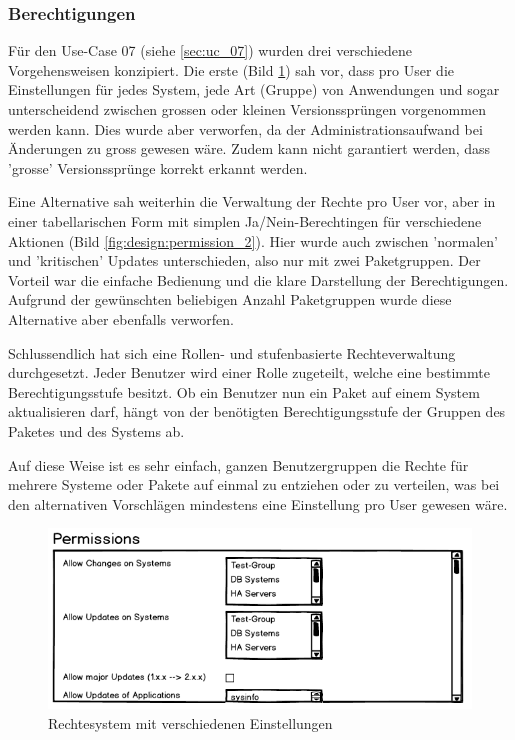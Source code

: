 \subsubsection*{Berechtigungen}

Für den Use-Case 07 (siehe \ref{sec:uc_07}) wurden drei verschiedene Vorgehensweisen konzipiert. Die erste (Bild \ref{fig:design:permission_1}) sah vor, dass pro User die Einstellungen für jedes System, jede Art (Gruppe) von Anwendungen und sogar unterscheidend zwischen grossen oder kleinen Versionssprüngen vorgenommen werden kann. Dies wurde aber verworfen, da der Administrationsaufwand bei Änderungen zu gross gewesen wäre. Zudem kann nicht garantiert werden, dass 'grosse' Versionssprünge korrekt erkannt werden.

Eine Alternative sah weiterhin die Verwaltung der Rechte pro User vor, aber in einer tabellarischen Form mit simplen Ja/Nein-Berechtingen für verschiedene Aktionen (Bild \ref{fig:design:permission_2}). Hier wurde auch zwischen 'normalen' und 'kritischen' Updates unterschieden, also nur mit zwei Paketgruppen. Der Vorteil war die einfache Bedienung und die klare Darstellung der Berechtigungen. Aufgrund der gewünschten beliebigen Anzahl Paketgruppen wurde diese Alternative aber ebenfalls verworfen.

Schlussendlich hat sich eine Rollen- und stufenbasierte Rechteverwaltung durchgesetzt. Jeder Benutzer wird einer Rolle zugeteilt, welche eine bestimmte Berechtigungsstufe besitzt. Ob ein Benutzer nun ein Paket auf einem System aktualisieren darf, hängt von der benötigten Berechtigungsstufe der Gruppen des Paketes und des Systems ab.

Auf diese Weise ist es sehr einfach, ganzen Benutzergruppen die Rechte für mehrere Systeme oder Pakete auf einmal zu entziehen oder zu verteilen, was bei den alternativen Vorschlägen mindestens eine Einstellung pro User gewesen wäre.

\begin{figure}[H]
	\centering
	\includegraphics[width=0.75\linewidth]{files/mockups/permission_1}
	\caption{Rechtesystem mit verschiedenen Einstellungen}
	\label{fig:design:permission_1}
\end{figure}

